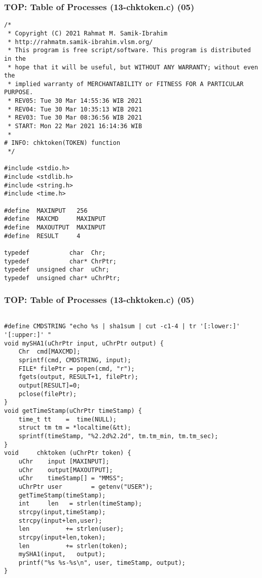 \documentclass[aspectratio=169, xcolor=table, notheorems, hyperref={pdfpagelabels=false}]{beamer}
\begin{document}
\begin{frame}[fragile]
\frametitle{TOP: Table of Processes (13-chktoken.c) (05)}
\begin{lstlisting}[basicstyle=\ttfamily\tiny]
/*
 * Copyright (C) 2021 Rahmat M. Samik-Ibrahim
 * http://rahmatm.samik-ibrahim.vlsm.org/
 * This program is free script/software. This program is distributed in the 
 * hope that it will be useful, but WITHOUT ANY WARRANTY; without even the 
 * implied warranty of MERCHANTABILITY or FITNESS FOR A PARTICULAR PURPOSE.
 * REV05: Tue 30 Mar 14:55:36 WIB 2021
 * REV04: Tue 30 Mar 10:35:13 WIB 2021
 * REV03: Tue 30 Mar 08:36:56 WIB 2021
 * START: Mon 22 Mar 2021 16:14:36 WIB
 *
# INFO: chktoken(TOKEN) function
 */

#include <stdio.h>
#include <stdlib.h>
#include <string.h>
#include <time.h>

#define  MAXINPUT   256
#define  MAXCMD     MAXINPUT
#define  MAXOUTPUT  MAXINPUT
#define  RESULT     4

typedef           char  Chr;
typedef           char* ChrPtr;
typedef  unsigned char  uChr;
typedef  unsigned char* uChrPtr;

\end{lstlisting}
\end{frame}

\begin{frame}[fragile]
\frametitle{TOP: Table of Processes (13-chktoken.c) (05)}
\begin{lstlisting}[basicstyle=\ttfamily\tiny]

#define CMDSTRING "echo %s | sha1sum | cut -c1-4 | tr '[:lower:]' '[:upper:]' "
void mySHA1(uChrPtr input, uChrPtr output) {
    Chr  cmd[MAXCMD];
    sprintf(cmd, CMDSTRING, input);
    FILE* filePtr = popen(cmd, "r");
    fgets(output, RESULT+1, filePtr);
    output[RESULT]=0;
    pclose(filePtr);
}
void getTimeStamp(uChrPtr timeStamp) {
    time_t tt    =  time(NULL);
    struct tm tm = *localtime(&tt);
    sprintf(timeStamp, "%2.2d%2.2d", tm.tm_min, tm.tm_sec);
}
void     chktoken (uChrPtr token) {
    uChr    input [MAXINPUT];
    uChr    output[MAXOUTPUT];
    uChr    timeStamp[] = "MMSS";
    uChrPtr user        = getenv("USER");
    getTimeStamp(timeStamp);
    int     len   = strlen(timeStamp);
    strcpy(input,timeStamp);
    strcpy(input+len,user);
    len          += strlen(user);
    strcpy(input+len,token);
    len          += strlen(token);
    mySHA1(input,   output);
    printf("%s %s-%s\n", user, timeStamp, output);
}

\end{lstlisting}
\end{frame}
\end{document}
